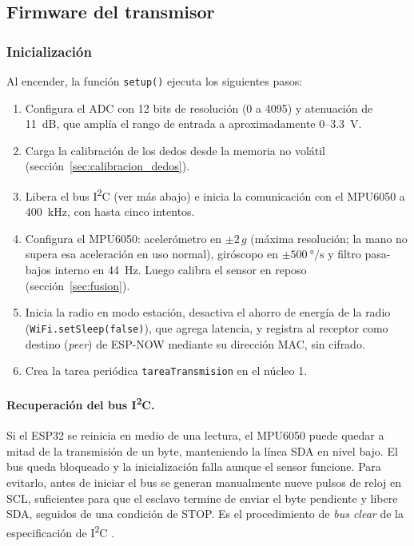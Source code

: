 \subsection{Firmware del transmisor}

\subsubsection{Inicialización}

Al encender, la función \texttt{setup()} ejecuta los siguientes pasos:

\begin{enumerate}
    \item Configura el ADC con 12 bits de resolución (0 a 4095) y atenuación de \SI{11}{\deci\bel}, que amplía el rango de entrada a aproximadamente 0--\SI{3.3}{\volt}.
    \item Carga la calibración de los dedos desde la memoria no volátil (sección~\ref{sec:calibracion_dedos}).
    \item Libera el bus I\textsuperscript{2}C (ver más abajo) e inicia la comunicación con el MPU6050 a \SI{400}{\kilo\hertz}, con hasta cinco intentos.
    \item Configura el MPU6050: acelerómetro en $\pm 2\,g$ (máxima resolución; la mano no supera esa aceleración en uso normal), giróscopo en $\pm\SI{500}{\degree\per\second}$ y filtro pasa-bajos interno en \SI{44}{\hertz}. Luego calibra el sensor en reposo (sección~\ref{sec:fusion}).
    \item Inicia la radio en modo estación, desactiva el ahorro de energía de la radio (\texttt{WiFi.setSleep(false)}), que agrega latencia, y registra al receptor como destino (\textit{peer}) de ESP-NOW mediante su dirección MAC, sin cifrado.
    \item Crea la tarea periódica \texttt{tareaTransmision} en el núcleo 1.
\end{enumerate}

\paragraph{Recuperación del bus I\textsuperscript{2}C.} Si el ESP32 se reinicia en medio de una lectura, el MPU6050 puede quedar a mitad de la transmisión de un byte, manteniendo la línea SDA en nivel bajo. El bus queda bloqueado y la inicialización falla aunque el sensor funcione. Para evitarlo, antes de iniciar el bus se generan manualmente nueve pulsos de reloj en SCL, suficientes para que el esclavo termine de enviar el byte pendiente y libere SDA, seguidos de una condición de STOP. Es el procedimiento de \textit{bus clear} de la especificación de I\textsuperscript{2}C \cite{nxp_i2c}.

